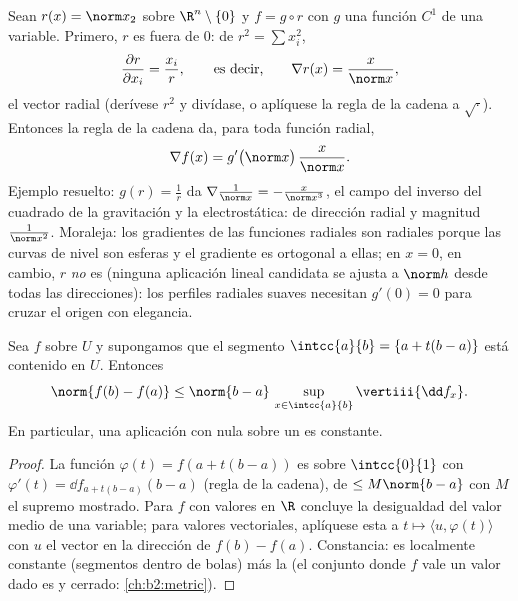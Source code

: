 \begin{example}\label{ex:b2:diffcalc:radial}
Sean $r(x) = \norm x_2$ sobre $\R^n\setminus\{0\}$ y $f = g \circ r$
con $g$ una función $C^1$ de una variable. Primero, $r$ es
 fuera de $0$: de $r^2 = \sum x_i^2$,
\[
\frac{\partial r}{\partial x_i} = \frac{x_i}{r},
\qquad\text{es decir,}\qquad
\nabla r(x) = \frac{x}{\norm x} ,
\]
el vector radial  (derívese $r^2$ y divídase, o aplíquese la
regla de la cadena a $\sqrt{\cdot}$). Entonces la regla de la cadena
da, para toda función radial,
\[
\nabla f(x) = g'\bigl(\norm x\bigr)\,\frac{x}{\norm x} .
\]
Ejemplo resuelto: $g(r) = \frac1r$ da $\nabla\frac{1}{\norm x} =
-\frac{x}{\norm x^3}$, el campo del inverso del cuadrado de la
gravitación y la electrostática: de dirección radial y magnitud
$\frac{1}{\norm x^2}$. Moraleja: los gradientes de las funciones
radiales son radiales porque las curvas de nivel son esferas y el
gradiente es ortogonal a ellas; en $x = 0$, en cambio, $r$ \emph{no}
es  (ninguna aplicación lineal candidata se ajusta a
$\norm h$ desde todas las direcciones): los perfiles radiales suaves
necesitan $g'(0) = 0$ para cruzar el origen con elegancia.
\end{example}

\begin{theorem}\label{thm:b2:diffcalc:mvi}
Sea $f$  sobre $U$ y supongamos que el segmento
$\intcc{a}{b} = \{a + t(b-a)\}$ está contenido en $U$. Entonces
\[
\norm{f(b) - f(a)} \leq \norm{b - a}\,
\sup_{x \in \intcc{a}{b}} \vertiii{\dd f_x} .
\]
En particular, una aplicación  con  nula sobre
un  \emph{} es constante.
\end{theorem}

\begin{proof}
La función $\varphi(t) = f(a + t(b-a))$ es  sobre
$\intcc{0}{1}$ con $\varphi'(t) = \dd f_{a + t(b-a)}(b - a)$ (regla
de la cadena), de  $\leq M\norm{b-a}$ con $M$ el supremo
mostrado. Para $f$ con valores en $\R$ concluye la desigualdad del
valor medio de una variable; para valores vectoriales, aplíquese esta
a $t \mapsto \langle u, \varphi(t)\rangle$ con $u$ el vector 
en la dirección de $f(b) - f(a)$. Constancia: es localmente constante
(segmentos dentro de bolas) más la  (el conjunto donde $f$
vale un valor dado es  y cerrado: \cref{ch:b2:metric}).
\end{proof}

